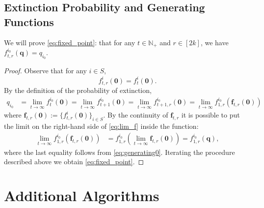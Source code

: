 \documentclass[preprint,3p,12pt]{elsarticle}
\theoremstyle{definition}
\begin{document}
\subsection{Extinction Probability and Generating Functions} \label{f_and_q}
We will prove \eqref{eq:fixed_point}: that for any $t \in \mathbb{N}_+$ and $r \in [2k]$, we have $f_{t,r}^{i_0}(\boldsymbol{q}) = q_{i_0}$.
\begin{proof}
Observe that for any $i \in S$,
\begin{equation}
    f^{i}_{t,r}(\boldsymbol{0}) = f_t^{i}(\boldsymbol{0}). \label{eq:generating0}
\end{equation}
By the definition of the probability of extinction,
    \begin{align}
        q_{i_0} &= \lim_{t \rightarrow \infty} f_t^{i_0}(\boldsymbol{0}) %
         = \lim_{t \rightarrow \infty} f_{t+1}^{i_0}(\boldsymbol{0}) %
         = \lim_{t \rightarrow \infty} f_{t+1, r}^{i_0}(\boldsymbol{0}) %
         = \lim_{t \rightarrow \infty} f_{1, r}^{i_0} (\boldsymbol{f}_{t, r}(\boldsymbol{0})) \label{eq:lim_f}
        \end{align}
    where $\boldsymbol{f}_{t, r}(\boldsymbol{0}) := \{f_{t, r}^{i}(\boldsymbol{0})\}_{i \in S}$. By the continuity of $\boldsymbol{f}_{t,r}$ it is possible to put the limit on the right-hand side of \eqref{eq:lim_f} inside the function:
    \begin{align*}
     \lim_{t \rightarrow \infty} f_{1, r}^{i_0} (\boldsymbol{f}_{t, r}(\boldsymbol{0}))
        & =  f_{1, r}^{i_0} (\lim_{t \rightarrow \infty}\boldsymbol{f}_{t, r}(\boldsymbol{0}))
        = f_{1, r}^{i_0} (\boldsymbol{q}), %
        \end{align*}
where the last equality follows from \eqref{eq:generating0}. Iterating the procedure described above we obtain \eqref{eq:fixed_point}. %
\end{proof}
\section{Additional Algorithms}
\end{document}
